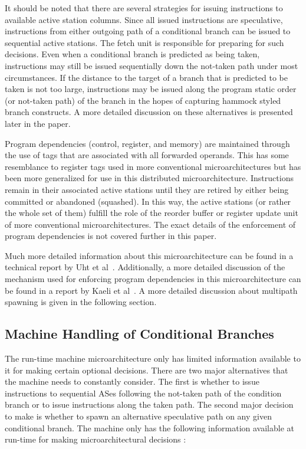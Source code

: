\documentclass[10pt,dvips]{article}
\begin{document}
It should be noted that there are several strategies for
issuing instructions to available active station columns.
Since all issued instructions are speculative, instructions
from either outgoing path of a conditional branch can be issued
to sequential active stations.
The fetch unit is responsible for preparing for such decisions.
Even when a conditional branch is predicted as being taken,
instructions may still be issued sequentially down the not-taken
path under most circumstances.  If the distance to the target 
of a branch
that is predicted to be taken is not too large,
instructions may be issued along the program static order (or not-taken
path) of the branch in the hopes of capturing hammock styled branch
constructs.  A more detailed discussion on these alternatives is
presented later in the paper.

Program dependencies (control, register, and memory) are 
maintained through the use of tags that
are associated with all forwarded operands.
This has some resemblance to register tags used in more conventional 
microarchitectures but has been more generalized for use in this
distributed microarchitecture.  Instructions remain in their
associated active stations until they are retired by either being
committed or abandoned (squashed).  In this way, the active stations
(or rather the whole set of them)
fulfill the role of the reorder buffer or register update unit of more
conventional microarchitectures.
The exact details of the enforcement of program dependencies
is not covered further in this paper.

Much more detailed information about this microarchitecture
can be found in a technical report by Uht et al~\cite{Uht01}.
Additionally, a more detailed discussion of the mechanism used for
enforcing program dependencies in this microarchitecture
can be found in a report by Kaeli et al~\cite{Kaeli01}.
A more detailed discussion about multipath spawning is given
in the following section.
%
\subsection{Machine Handling of Conditional Branches}
%
The run-time machine microarchitecture only has limited information
available to it for making certain optional decisions.
There are two major alternatives that the machine needs to constantly
consider.  The first is whether to issue instructions to sequential
ASes following
the not-taken path of the condition branch or to issue instructions
along the 
taken path.  
The second major decision to make is
whether to spawn an alternative speculative path
on any given conditional branch.
The machine only has the following information
available at run-time for making microarchitectural decisions :
\end{document}
